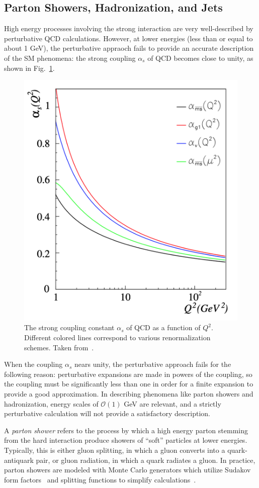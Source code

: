 \subsection{Parton Showers, Hadronization, and Jets} \label{sec:pp_physics_jets}
High energy processes involving the strong interaction are very well-described by perturbative QCD calculations.
However, at lower energies (less than or equal to about 1 GeV), the perturbative appraoch fails to provide an accurate description of the SM phenomena: the strong coupling $\alpha_s$ of QCD becomes close to unity, as shown in Fig.~\ref{fig:pp_qcd_coupling}.
\begin{figure} [htbp!]
    \centering
    \includegraphics[width=0.6\linewidth]{figures/physics_of_pp/pp_qcd_coupling.png}
    \caption{The strong coupling constant $\alpha_s$ of QCD as a function of $Q^2$. Different colored lines correspond to various renormalization schemes. Taken from~\cite{Deur:2016tte}.}
    \label{fig:pp_qcd_coupling}
\end{figure}
When the coupling $\alpha_s$ nears unity, the perturbative approach fails for the following reason: perturbative expansions are made in powers of the coupling, so the coupling must be significantly less than one in order for a finite expansion to provide a good approximation.
In describing phenomena like parton showers and hadronization, energy scales of $\mathcal O(1)$ GeV are relevant, and a strictly perturbative calculation will not provide a satisfactory description.

A \emph{parton shower} refers to the process by which a high energy parton stemming from the hard interaction produce showers of ``soft'' particles at lower energies.
Typically, this is either gluon splitting, in which a gluon converts into a quark-antiquark pair, or gluon radiation, in which a quark radiates a gluon.
In practice, parton showers are modeled with Monte Carlo generators which utilize Sudakov form factors~\cite{Sudakov:1954sw} and splitting functions to simplify calculations~\cite{Hoche:2014rg}.


